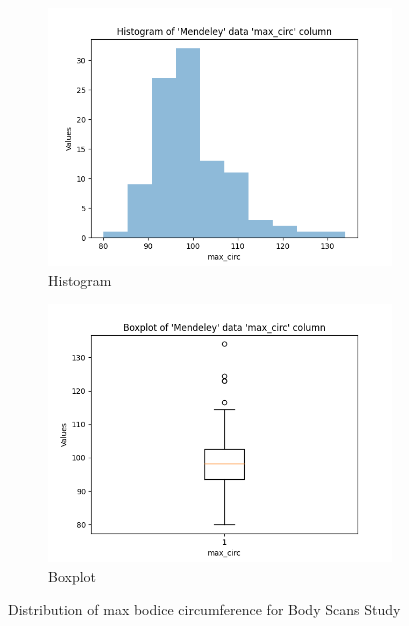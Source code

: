 \begin{figure}[htb]
    \centering
    \begin{subfigure}[b]{0.45\textwidth}
        \centering
        \includegraphics[width=\textwidth]{Images/Mendeley_max_circ_Hist.png}
        \caption{Histogram}
    \end{subfigure}
    \hfill
    \begin{subfigure}[b]{0.45\textwidth}
        \centering
        \includegraphics[width=\textwidth]{Images/Mendeley_max_circ_Boxplot.png}
        \caption{Boxplot}
    \end{subfigure}
    \caption{Distribution of max bodice circumference for Body Scans Study}
\end{figure}

